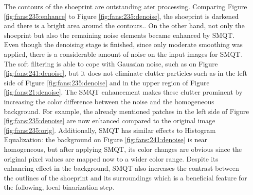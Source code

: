 \documentclass[draft,final]{vutinfth} %
\begin{document}
The contours of the shoeprint are outstanding ater processing.
Comparing Figure \ref{fig:fans:235:enhance} to Figure \ref{fig:fans:235:denoise}, the shoeprint is darkened and there is a bright area around the contours..
On the other hand, not only the shoeprint but also the remaining noise elements became enhanced by SMQT.
Even though the denoising stage is finished, since only moderate smoothing was applied, there is a considerable amount of noise on the input images for SMQT.
The soft filtering is able to cope with Gaussian noise, such as on Figure \ref{fig:fans:241:denoise}, but it does not eliminate clutter particles such as in the left side of Figure \ref{fig:fans:235:denoise} and in the upper region of Figure \ref{fig:fans:21:denoise}.
The SMQT enhancement makes these clutter prominent by increasing the color difference between the noise and the homogeneous background.
For example, the already mentioned patches in the left side of Figure \ref{fig:fans:235:denoise} are now enhanced compared to  the original image \ref{fig:fans:235:orig}.
Additionally, SMQT has similar effects to Histogram Equalization: the background on Figure \ref{fig:fans:241:denoise} is near homogeneous, but after applying SMQT, its color changes are obvious since the original pixel values are mapped now to a wider color range.
Despite its enhancing effect in the background, SMQT also increases the contrast between the outlines of the shoeprint and its surroundings which is a beneficial feature for the following, local binarization step.
\end{document}
